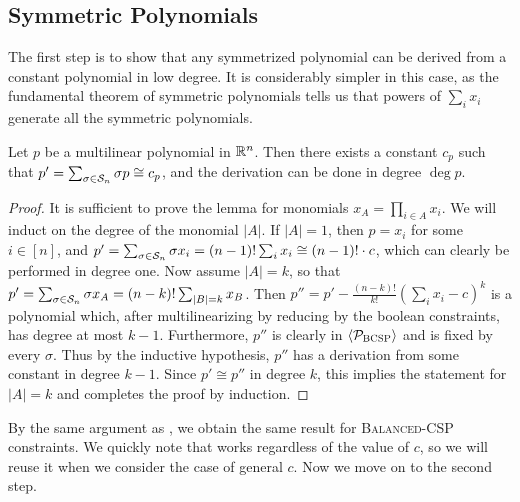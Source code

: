 \subsection{Symmetric Polynomials}
The first step is to show that any symmetrized polynomial can be derived from a constant polynomial in low degree. It is considerably simpler in this case, as the fundamental theorem of symmetric polynomials tells us that powers of $\sum_i x_i$ generate all the symmetric polynomials. 
\begin{lemma}\label{lem:bcsp-symmetric}
Let $p$ be a multilinear polynomial in $\mathbb R^n$. Then there exists a constant $c_p$ such that $p' = \sum_{\sigma \in \mathcal S_n} \sigma p \cong c_p$, and the derivation can be done in degree $\deg p$. 
\end{lemma}
\begin{proof}
It is sufficient to prove the lemma for monomials $x_A = \prod_{i \in A} x_i$. We will induct on the degree of the monomial $|A|$. 
If $|A| = 1$, then $p = x_i$ for some $i \in [n]$, and $p' = \sum_{\sigma \in \mathcal S_n} \sigma x_i = (n-1)!\sum_i x_i \cong (n-1)!\cdot c$, which can clearly be performed in degree one. Now assume $|A| = k$, so that $p' = \sum_{\sigma \in \mathcal S_n} \sigma x_A = (n-k)! \sum_{|B|=k} x_B$. Then $p'' = p' - \frac{(n-k)!}{k!}\left(\sum_i x_i - c\right)^k$ is a polynomial which, after multilinearizing by reducing by the boolean constraints, has degree at most $k-1$. Furthermore, $p''$ is clearly in $\langle \mathcal P_{\textsc{BCSP}} \rangle$ and is fixed by every $\sigma$. Thus by the inductive hypothesis, $p''$ has a derivation from some constant in degree $k-1$. Since $p' \cong p''$ in degree $k$, this implies the statement for $|A| = k$ and completes the proof by induction.
\end{proof}
By the same argument as , we obtain the same result for \textsc{Balanced-CSP} constraints. We quickly note that  works regardless of the value of $c$, so we will reuse it when we consider the case of general $c$. Now we move on to the second step.

